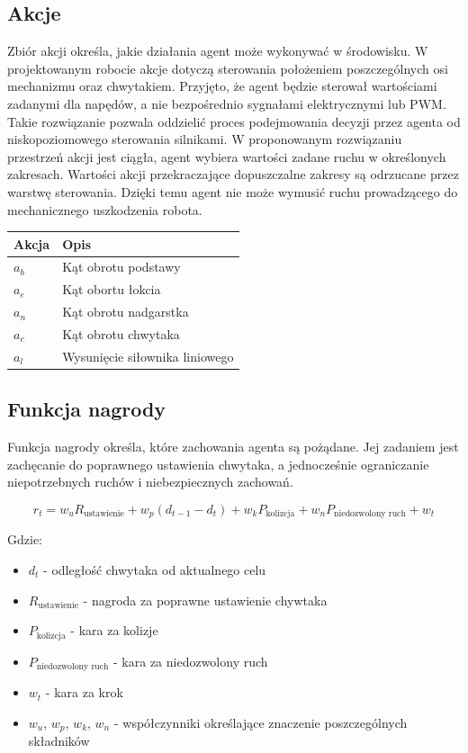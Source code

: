 \documentclass[12pt]{article}
\begin{document}
\subsection{Akcje}

Zbiór akcji określa, jakie działania agent może wykonywać w środowisku. W projektowanym robocie akcje dotyczą sterowania położeniem poszczególnych osi mechanizmu oraz chwytakiem.
Przyjęto, że agent będzie sterował wartościami zadanymi dla napędów, a nie bezpośrednio sygnałami elektrycznymi lub PWM. 
Takie rozwiązanie pozwala oddzielić proces podejmowania decyzji przez agenta od niskopoziomowego sterowania silnikami.
W proponowanym rozwiązaniu przestrzeń akcji jest ciągła, agent wybiera wartości zadane ruchu w określonych zakresach.
Wartości akcji przekraczające dopuszczalne zakresy są odrzucane przez warstwę sterowania. 
Dzięki temu agent nie może wymusić ruchu prowadzącego do mechanicznego uszkodzenia robota.

\begin{center}
\begin{tabular}{p{}p{}}
\toprule
Akcja & Opis \\
\midrule
$a_b$ & Kąt obrotu podstawy \\
$a_e$ & Kąt obortu łokcia \\
$a_n$ & Kąt obrotu nadgarstka \\
$a_c$ & Kąt obrotu chwytaka\\
$a_l$ & Wysunięcie siłownika liniowego\\
\bottomrule
\end{tabular}
\end{center}

\subsection{Funkcja nagrody}

Funkcja nagrody określa, które zachowania agenta są pożądane. 
Jej zadaniem jest zachęcanie do poprawnego ustawienia chwytaka, a jednocześnie ograniczanie niepotrzebnych ruchów i niebezpiecznych zachowań.

\begin{equation}
    r_t = w_u R_{\text{ustawienie}} + w_p(d_{t-1}-d_t) + w_k P_{\text{kolizcja}} + w_n P_{\text{niedozwolony ruch}} + w_t
\end{equation}

Gdzie:
\begin{itemize}
    \item $d_t$ - odległość chwytaka od aktualnego celu
    \item $R_{\text{ustawienie}}$ - nagroda za poprawne ustawienie chywtaka
    \item $P_{\text{kolizcja}}$ - kara za kolizje
    \item $P_{\text{niedozwolony ruch}}$ - kara za niedozwolony ruch
    \item $w_t$ - kara za krok
    \item $w_u$, $w_p$, $w_k$, $w_n$ - współczynniki określające znaczenie poszczególnych składników
\end{itemize}
\end{document}
